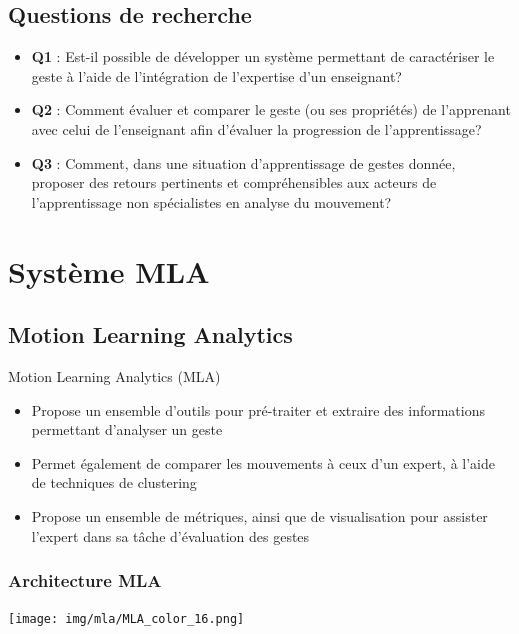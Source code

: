 \documentclass[svgnames]{beamer}
\begin{document}
	\subsection{Questions de recherche}
	\begin{frame}{\subsecname}
		\begin{itemize}[label=$-$]
			\item \textbf{Q1} : Est-il possible de développer un système permettant de caractériser le geste à l'aide de l'intégration de l'expertise d'un enseignant?
			\item \textbf{Q2} : Comment évaluer et comparer le geste (ou ses propriétés) de l'apprenant avec celui de l'enseignant afin d'évaluer la progression de l'apprentissage?
			\item \textbf{Q3} : Comment, dans une situation d'apprentissage de gestes donnée, proposer des retours pertinents et compréhensibles aux acteurs de l'apprentissage non spécialistes en analyse du mouvement?
		\end{itemize}
	\end{frame}

	\section{Système MLA}
	\subsection{Motion Learning Analytics}
	\begin{frame}{\subsecname}
		\begin{block}{Motion Learning Analytics (MLA)}
			\begin{itemize}[label=$\bullet$]
				\item Propose un ensemble d'outils pour pré-traiter et extraire des informations permettant d'analyser un geste
				\item Permet également de comparer les mouvements à ceux d'un expert, à l'aide de techniques de clustering
				\item Propose un ensemble de métriques, ainsi que de visualisation pour assister l'expert dans sa tâche d'évaluation des gestes
			\end{itemize}
		\end{block}
	\end{frame}
	
	\subsubsection{Architecture MLA}
	\begin{frame}{\subsubsecname}
	\centering
		\texttt{[image: img/mla/MLA\_color\_16.png]}
	\end{frame}
	
\end{document}
